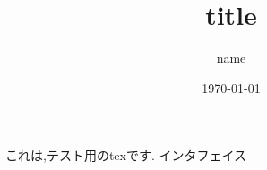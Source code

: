 \documentclass[a4paper, 10pt, titlepage, uplatex]{jsarticle}
\title{title}
\author{name}
\date{\today}
\begin{document}
\maketitle

\section{}
これは,テスト用のtexです.
インタフェイス
\end{document}
